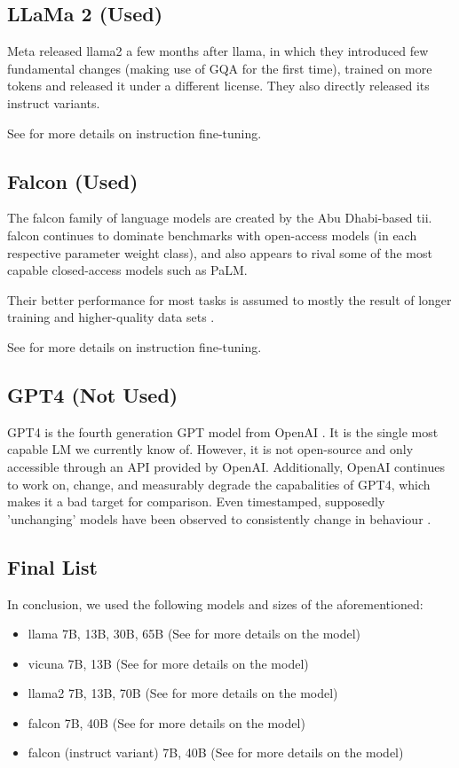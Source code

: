 \subsection{LLaMa 2 (Used)}\label{sub:llama2}
\gls{Meta} released \gls{llama2} a few months after \gls{llama}, in which they introduced few fundamental changes (making use of \gls{GQA} for the first time), trained on more tokens and released it under a different license. They also directly released its instruct variants.

See  for more details on instruction fine-tuning.

\subsection{Falcon (Used)}\label{sub:falcon}
The \gls{falcon} \cite{zxhang_falcon_2023} family of language models are created by the Abu Dhabi-based \gls{tii}.
\gls{falcon} continues to dominate benchmarks with open-access models (in each respective parameter weight class), and also appears to rival some of the most capable closed-access models such as \gls{PaLM}.

Their better performance for most tasks is assumed to mostly the result of longer training and higher-quality data sets \cite{zxhang_falcon_2023}.

See  for more details on instruction fine-tuning.

\subsection{GPT4 (Not Used)}\label{sub:gpt4}
\gls{GPT4} is the fourth generation \gls{GPT} model from \gls{OpenAI} \cite{openai_gpt4_2023}.
It is the single most capable \acrlong{LM} we currently know of.
However, it is not open-source and only accessible through an API provided by \gls{OpenAI}.
Additionally, \gls{OpenAI} continues to work on, change, and measurably degrade the capabalities \cite{chen_how_2023} of \gls{GPT4}, which makes it a bad target for comparison.
Even timestamped, supposedly 'unchanging' models have been observed to consistently change in behaviour \cite{jw1224_hn}.

\subsection{Final List}\label{sub:list}
In conclusion, we used the following models and sizes of the aforementioned:
\begin{itemize}
    \item \gls{llama} 7B, 13B, 30B, 65B (See  for more details on the model)
    \item \gls{vicuna} 7B, 13B (See  for more details on the model)
    \item \gls{llama2} 7B, 13B, 70B (See  for more details on the model)
    \item \gls{falcon} 7B, 40B (See  for more details on the model)
    \item \gls{falcon} (instruct variant) 7B, 40B (See  for more details on the model)
\end{itemize}


